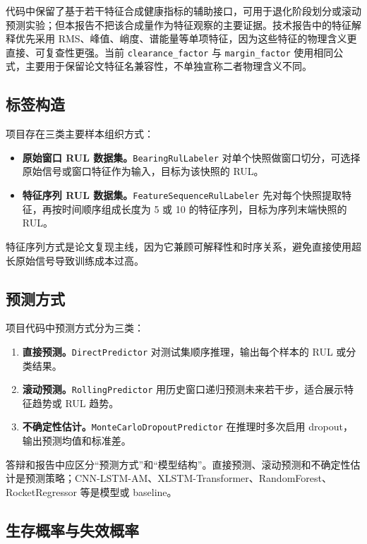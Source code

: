 \documentclass[UTF8,a4paper,12pt]{ctexart}
\newcommand{\code}[1]{\texttt{#1}}
\begin{document}
代码中保留了基于若干特征合成健康指标的辅助接口，可用于退化阶段划分或滚动预测实验；但本报告不把该合成量作为特征观察的主要证据。技术报告中的特征解释优先采用 RMS、峰值、峭度、谱能量等单项特征，因为这些特征的物理含义更直接、可复查性更强。当前 \code{clearance\_factor} 与 \code{margin\_factor} 使用相同公式，主要用于保留论文特征名兼容性，不单独宣称二者物理含义不同。

\subsection{标签构造}

项目存在三类主要样本组织方式：

\begin{itemize}
  \item \textbf{原始窗口 RUL 数据集。}\code{BearingRulLabeler} 对单个快照做窗口切分，可选择原始信号或窗口特征作为输入，目标为该快照的 RUL。
  \item \textbf{特征序列 RUL 数据集。}\code{FeatureSequenceRulLabeler} 先对每个快照提取特征，再按时间顺序组成长度为 5 或 10 的特征序列，目标为序列末端快照的 RUL。
\end{itemize}

特征序列方式是论文复现主线，因为它兼顾可解释性和时序关系，避免直接使用超长原始信号导致训练成本过高。

\subsection{预测方式}

项目代码中预测方式分为三类：

\begin{enumerate}
  \item \textbf{直接预测。}\code{DirectPredictor} 对测试集顺序推理，输出每个样本的 RUL 或分类结果。
  \item \textbf{滚动预测。}\code{RollingPredictor} 用历史窗口递归预测未来若干步，适合展示特征趋势或 RUL 趋势。
  \item \textbf{不确定性估计。}\code{MonteCarloDropoutPredictor} 在推理时多次启用 dropout，输出预测均值和标准差。
\end{enumerate}

答辩和报告中应区分“预测方式”和“模型结构”。直接预测、滚动预测和不确定性估计是预测策略；CNN-LSTM-AM、XLSTM-Transformer、RandomForest、RocketRegressor 等是模型或 baseline。

\subsection{生存概率与失效概率}
\end{document}
